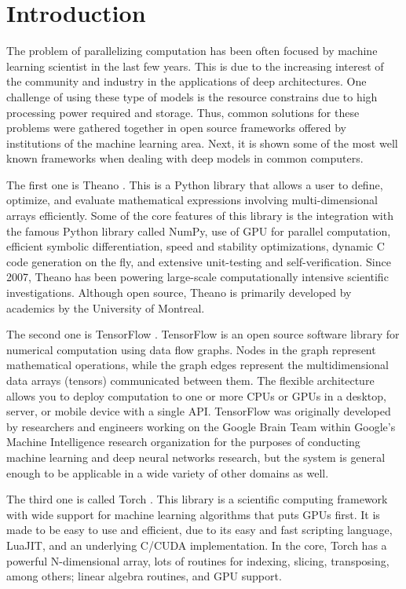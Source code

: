 \section{Introduction}
\label{sec:intro}

The problem of parallelizing computation has been often focused by machine learning scientist in the last few years.
This is due to the increasing interest of the community and industry in the applications of deep architectures.
One challenge of using these type of models is the resource constrains due to high processing power required and storage.
Thus, common solutions for these problems were gathered together in open source frameworks offered by institutions of the machine learning area.
Next, it is shown some of the most well known frameworks when dealing with deep models in common computers.

The first one is Theano \citep{theano}.
This is a Python library that allows a user to define, optimize, and evaluate mathematical expressions involving multi-dimensional arrays efficiently.
Some of the core features of this library is the integration with the famous Python library called NumPy, use of GPU for parallel computation, efficient symbolic differentiation, speed and stability optimizations, dynamic C code generation on the fly, and extensive unit-testing and self-verification.
Since 2007, Theano has been powering large-scale computationally intensive scientific investigations.
Although open source, Theano is primarily developed by academics by the University of Montreal.


The second one is TensorFlow \citep{tensorflow}.
TensorFlow is an open source software library for numerical computation using data flow graphs.
Nodes in the graph represent mathematical operations, while the graph edges represent the multidimensional data arrays (tensors) communicated between them.
The flexible architecture allows you to deploy computation to one or more CPUs or GPUs in a desktop, server, or mobile device with a single API. 
TensorFlow was originally developed by researchers and engineers working on the Google Brain Team within Google's Machine Intelligence research organization for the purposes of conducting machine learning and deep neural networks research, but the system is general enough to be applicable in a wide variety of other domains as well.

The third one is called Torch \cite{torch}.
This library is a scientific computing framework with wide support for machine learning algorithms that puts GPUs first.
It is made to be easy to use and efficient, due to its easy and fast scripting language, LuaJIT, and an underlying C/CUDA implementation.
In the core, Torch has a powerful N-dimensional array, lots of routines for indexing, slicing, transposing, among others; linear algebra routines, and GPU support.